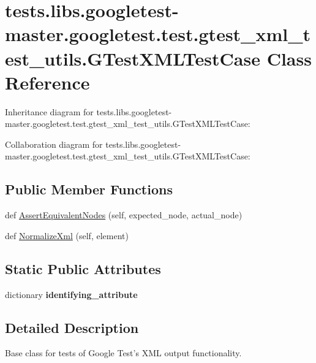 \hypertarget{classtests_1_1libs_1_1googletest-master_1_1googletest_1_1test_1_1gtest__xml__test__utils_1_1GTestXMLTestCase}{}\section{tests.\+libs.\+googletest-\/master.googletest.\+test.\+gtest\+\_\+xml\+\_\+test\+\_\+utils.\+G\+Test\+X\+M\+L\+Test\+Case Class Reference}
\label{classtests_1_1libs_1_1googletest-master_1_1googletest_1_1test_1_1gtest__xml__test__utils_1_1GTestXMLTestCase}


Inheritance diagram for tests.\+libs.\+googletest-\/master.googletest.\+test.\+gtest\+\_\+xml\+\_\+test\+\_\+utils.\+G\+Test\+X\+M\+L\+Test\+Case\+:


Collaboration diagram for tests.\+libs.\+googletest-\/master.googletest.\+test.\+gtest\+\_\+xml\+\_\+test\+\_\+utils.\+G\+Test\+X\+M\+L\+Test\+Case\+:
\subsection*{Public Member Functions}
\begin{DoxyCompactItemize}
\item 
def \hyperlink{classtests_1_1libs_1_1googletest-master_1_1googletest_1_1test_1_1gtest__xml__test__utils_1_1GTestXMLTestCase_aaea9771572de9eaf423f931429025d9c}{Assert\+Equivalent\+Nodes} (self, expected\+\_\+node, actual\+\_\+node)
\item 
def \hyperlink{classtests_1_1libs_1_1googletest-master_1_1googletest_1_1test_1_1gtest__xml__test__utils_1_1GTestXMLTestCase_afed0cd3ae51ca27ffcd8af84b161706a}{Normalize\+Xml} (self, element)
\end{DoxyCompactItemize}
\subsection*{Static Public Attributes}
\begin{DoxyCompactItemize}
\item 
dictionary {\bfseries identifying\+\_\+attribute}
\end{DoxyCompactItemize}


\subsection{Detailed Description}
\begin{DoxyVerb}Base class for tests of Google Test's XML output functionality.
\end{DoxyVerb}
 

